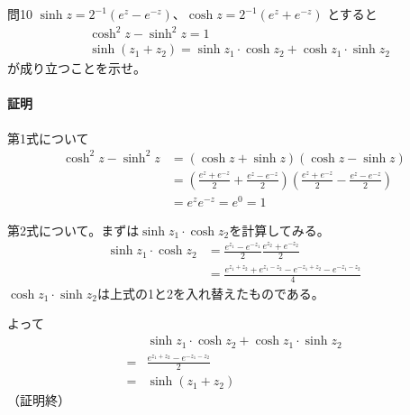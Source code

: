 \begin{mysimplebox}{問10}
    $\sinh z=2^{-1}(e^z-e^{-z})$、$\cosh z=2^{-1}(e^z+e^{-z})$
    とすると
    \begin{align*}
        &\cosh^2z-\sinh^2z=1\\
        &\sinh(z_1+z_2)=\sinh z_1\cdot\cosh z_2+\cosh z_1\cdot\sinh z_2
    \end{align*}
    が成り立つことを示せ。
\end{mysimplebox}
\paragraph{証明}
第1式について
\begin{align*}
    \cosh^2z-\sinh^2z&=(\cosh z+\sinh z)(\cosh z-\sinh z)\\
    &=\left(\frac{e^z+e^{-z}}{2}+\frac{e^z-e^{-z}}{2}\right)
    \left(\frac{e^z+e^{-z}}{2}-\frac{e^z-e^{-z}}{2}\right)\\
    &=e^ze^{-z}=e^0=1
\end{align*}

第2式について。まずは$\sinh z_1\cdot\cosh z_2$を計算してみる。
\begin{align*}
    \sinh z_1\cdot\cosh z_2
    &=\frac{e^{z_1}-e^{-z_1}}{2}\frac{e^{z_2}+e^{-z_2}}{2}\\
    &=\frac{e^{z_1+z_2}+e^{z_1-z_2}-e^{-z_1+z_2}-e^{-z_1-z_2}}{4}
\end{align*}
$\cosh z_1\cdot\sinh z_2$は上式の1と2を入れ替えたものである。

よって
\begin{align*}
    &\sinh z_1\cdot\cosh z_2+\cosh z_1\cdot\sinh z_2\\
    =&\frac{e^{z_1+z_2}-e^{-z_1-z_2}}{2}\\
    =&\sinh(z_1+z_2)
\end{align*}
（証明終）